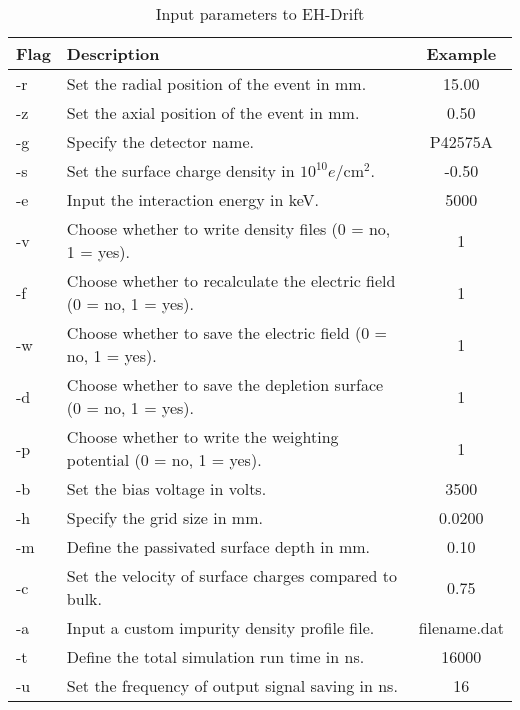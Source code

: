 \begin{table}[!htb]
    \centering
    \renewcommand{\arraystretch}{1.3} %
    \begin{tabular}{|l|p{10cm}|c|}
        \hline
        \textbf{Flag} & \textbf{Description} & \textbf{Example} \\ 
        \hline
        -r & Set the radial position of the event in mm. & 15.00 \\
        \hline
        -z & Set the axial position of the event in mm. & 0.50 \\
        \hline
        -g & Specify the detector name. & P42575A \\
        \hline
        -s & Set the surface charge density in $10^{10} e/\text{cm}^2$. & -0.50 \\
        \hline
        -e & Input the interaction energy in keV. & 5000 \\
        \hline
        -v & Choose whether to write density files (0 = no, 1 = yes). & 1 \\
        \hline
        -f & Choose whether to recalculate the electric field (0 = no, 1 = yes). & 1 \\
        \hline
        -w & Choose whether to save the electric field (0 = no, 1 = yes). & 1 \\
        \hline
        -d & Choose whether to save the depletion surface (0 = no, 1 = yes). & 1 \\
        \hline
        -p & Choose whether to write the weighting potential (0 = no, 1 = yes). & 1 \\
        \hline
        -b & Set the bias voltage in volts. & 3500 \\
        \hline
        -h & Specify the grid size in mm. & 0.0200 \\
        \hline
        -m & Define the passivated surface depth in mm. & 0.10 \\
        \hline
        -c & Set the velocity of surface charges compared to bulk. & 0.75 \\
        \hline
        -a & Input a custom impurity density profile file. & filename.dat \\
        \hline
        -t & Define the total simulation run time in ns. & 16000 \\
        \hline
        -u & Set the frequency of output signal saving in ns. & 16 \\
        \hline
    \end{tabular}
    \caption{Input parameters to EH-Drift}
    \label{tab:ehdrift_parameters}
\end{table}
